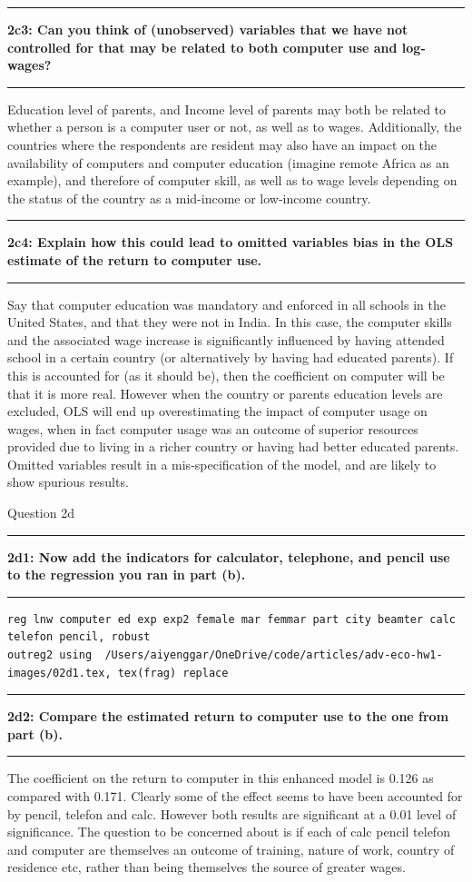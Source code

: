 \documentclass[12pt]{article}
\newcommand\question[2]{\vspace{1em}\hrule\vspace{1em}\textbf{#1: #2}\vspace{1em}\hrule\vspace{1em}}
\begin{document}
\question{2c3}{Can you think of (unobserved) variables that we have not controlled for that may be related to both computer use and log-wages?  }
Education level of parents, and Income level of parents may both be related to whether a person is a computer user or not, as well as to wages. Additionally, the countries where the respondents are resident may also have an impact on the availability of computers and computer education (imagine remote Africa as an example), and therefore of computer skill, as well as to wage levels depending on the status of the country as a mid-income or low-income country.

\question{2c4}{Explain how this could lead to omitted variables bias in the OLS estimate of the return to computer use. } 
Say that computer education was mandatory and enforced in all schools in the United States, and that they were not in India. In this case, the computer skills and the associated wage increase is significantly influenced by  having attended school in a certain country (or alternatively by having had educated parents). If this is accounted for (as it should be), then the coefficient on computer will be that it is more real. However when the country or parents education levels are excluded, OLS will end up overestimating the impact of computer usage on wages, when in fact computer usage was an outcome of superior resources provided due to living in a richer country or having had better educated parents. Omitted variables result in a mis-specification of the model, and are likely to show spurious results.

\begin{center}\LARGE{Question 2d}\end{center}
\question{2d1}{Now add the indicators for calculator, telephone, and pencil use to the regression you ran in part (b).  }
\begin{lstlisting}
reg lnw computer ed exp exp2 female mar femmar part city beamter calc telefon pencil, robust
outreg2 using  /Users/aiyenggar/OneDrive/code/articles/adv-eco-hw1-images/02d1.tex, tex(frag) replace
\end{lstlisting}


\question{2d2}{Compare the estimated return to computer use to the one from part (b).  }
The coefficient on the return to computer in this enhanced model is 0.126 as compared with 0.171. Clearly some of the effect seems to have been accounted for by pencil, telefon and calc. However both results are significant at a 0.01 level of significance. The question to be concerned about is if each of calc pencil telefon and computer are themselves an outcome of training, nature of work, country of residence etc, rather than being themselves the source of greater wages.
\end{document}
